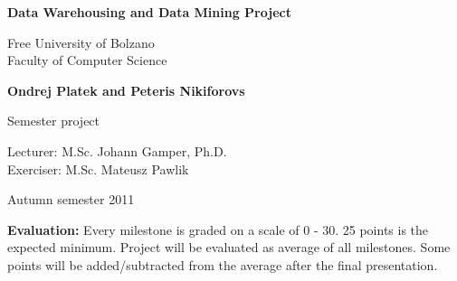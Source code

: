 \begin{titlepage}
\begin{center}

\vspace{15mm}
{\Large\bf Data Warehousing and Data Mining Project}
\vspace{10mm}

\large
Free University of Bolzano\\
Faculty of Computer Science\\
\vspace{15mm}

{\Large\bf Ondrej Platek and Peteris Nikiforovs}\\ 
\vspace{5mm}

{\Large Semester project}
\vspace{20mm}

Lecturer: M.Sc. Johann Gamper, Ph.D.\\
Exerciser: M.Sc. Mateusz Pawlik\\
\vspace{20mm}

Autumn semester 2011
\vspace{10mm}

\end{center}

\noindent 
{\bf Evaluation:}
Every milestone is graded on a scale of 0 - 30.
25 points is the expected minimum.
Project will be evaluated as average of all milestones.
Some points will be added/subtracted from the average after the final presentation.
\end{titlepage} %

\tableofcontents
